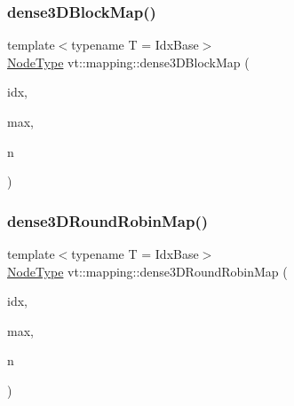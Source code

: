 \subsubsection{\texorpdfstring{dense3\+D\+Block\+Map()}{dense3DBlockMap()}}
{\footnotesize\ttfamily template$<$typename T  = Idx\+Base$>$ \\
\hyperlink{namespacevt_a866da9d0efc19c0a1ce79e9e492f47e2}{Node\+Type} vt\+::mapping\+::dense3\+D\+Block\+Map (\begin{DoxyParamCaption}\item[{\hyperlink{namespacevt_1_1mapping_aacc737158b6517f2d760ffc8d1b5abca}{Idx3\+D\+Ptr}$<$ T $>$}]{idx,  }\item[{\hyperlink{namespacevt_1_1mapping_aacc737158b6517f2d760ffc8d1b5abca}{Idx3\+D\+Ptr}$<$ T $>$}]{max,  }\item[{\hyperlink{namespacevt_a866da9d0efc19c0a1ce79e9e492f47e2}{Node\+Type}}]{n }\end{DoxyParamCaption})}

\mbox{\label{namespacevt_1_1mapping_aa48fa3b830b637787c584dbac5bba6db}} 
\subsubsection{\texorpdfstring{dense3\+D\+Round\+Robin\+Map()}{dense3DRoundRobinMap()}}
{\footnotesize\ttfamily template$<$typename T  = Idx\+Base$>$ \\
\hyperlink{namespacevt_a866da9d0efc19c0a1ce79e9e492f47e2}{Node\+Type} vt\+::mapping\+::dense3\+D\+Round\+Robin\+Map (\begin{DoxyParamCaption}\item[{\hyperlink{namespacevt_1_1mapping_aacc737158b6517f2d760ffc8d1b5abca}{Idx3\+D\+Ptr}$<$ T $>$}]{idx,  }\item[{\hyperlink{namespacevt_1_1mapping_aacc737158b6517f2d760ffc8d1b5abca}{Idx3\+D\+Ptr}$<$ T $>$}]{max,  }\item[{\hyperlink{namespacevt_a866da9d0efc19c0a1ce79e9e492f47e2}{Node\+Type}}]{n }\end{DoxyParamCaption})}

\mbox{\label{namespacevt_1_1mapping_a290c8ece78ae8ffc8aa79dbb43a743d6}} 
